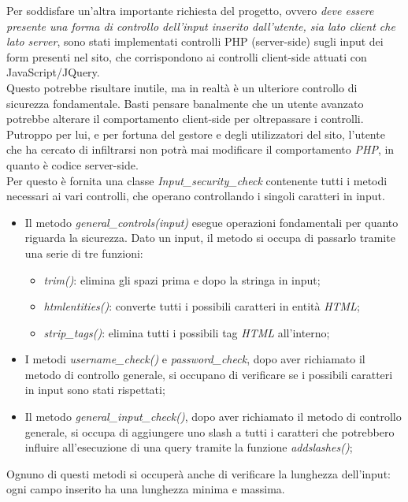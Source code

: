 Per soddisfare un'altra importante richiesta del progetto, ovvero \emph{deve essere presente una forma di controllo dell’input inserito dall’utente, 
sia lato client che lato server}, sono stati implementati controlli PHP (server-side) sugli input dei form presenti nel sito, che corrispondono ai 
controlli client-side attuati con JavaScript/JQuery.\\
Questo potrebbe risultare inutile, ma in realtà è un ulteriore controllo di sicurezza fondamentale. Basti pensare banalmente che un utente
avanzato potrebbe alterare il comportamento client-side per oltrepassare i controlli. Putroppo per lui, e per fortuna del gestore e degli
utilizzatori del sito, l'utente che ha cercato di infiltrarsi non potrà mai modificare il comportamento \emph{PHP}, in quanto è codice server-side.\\
Per questo è fornita una classe \emph{Input\_security\_check} contenente tutti i metodi necessari ai vari controlli, che operano controllando 
i singoli caratteri in input.
\begin{itemize}
    \item Il metodo \emph{general\_controls(input)} esegue operazioni fondamentali per quanto riguarda la sicurezza. Dato un input, il metodo si 
    occupa di passarlo tramite una serie di tre funzioni: 
    \begin{itemize}
        \item \emph{trim()}: elimina gli spazi prima e dopo la stringa in input;
        \item \emph{htmlentities()}: converte tutti i possibili caratteri in entità \emph{HTML};
        \item \emph{strip\_tags()}: elimina tutti i possibili tag \emph{HTML} all'interno;
    \end{itemize}
    \item I metodi \emph{username\_check()} e \emph{password\_check}, dopo aver richiamato il metodo di controllo generale, si occupano di 
    verificare se i possibili caratteri in input sono stati rispettati;
    \item Il metodo \emph{general\_input\_check()}, dopo aver richiamato il metodo di controllo generale, si occupa di aggiungere uno slash a 
    tutti i caratteri che potrebbero influire all'esecuzione di una query tramite la funzione \emph{addslashes()};
\end{itemize}

Ognuno di questi metodi si occuperà anche di verificare la lunghezza dell'input: ogni campo inserito ha una lunghezza minima e massima.\\